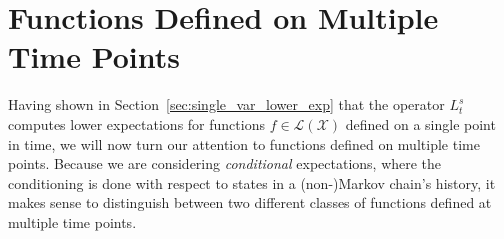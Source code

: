 \documentclass[10pt,a4paper]{paper}
\theoremstyle{definition}
\newcommand{\states}{\mathcal{X}}
\newcommand{\processes}{\mathbb{P}}
\newcommand{\wprocesses}{\processes^{\mathrm{W}}}
\newcommand{\gambles}{\mathcal{L}}
\newcommand{\gamblesX}{\gambles(\states)}
\newcommand{\rateset}{\mathcal{Q}}
\newcommand{\lrate}{\underline{Q}}
\newcommand{\coloneqq}{:\!=}
\begin{document}
%
%
%

\section{Functions Defined on Multiple Time Points}\label{sec:funcs_multi_time_points}

Having shown in Section~\ref{sec:single_var_lower_exp} that the operator $L_t^s$ computes lower expectations for functions $f\in\gamblesX$ defined on a single point in time, we will now turn our attention to functions defined on multiple time points. Because we are considering \emph{conditional} expectations, where the conditioning is done with respect to states in a (non-)Markov chain's history, it makes sense to distinguish between two different classes of functions defined at multiple time points. 
\end{document}
